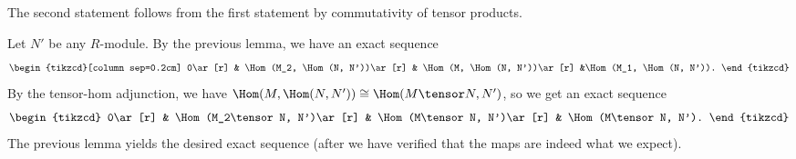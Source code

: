 The second statement follows from the first statement by commutativity
of tensor products.

Let $N'$ be any $R$-module. By the previous lemma, we have an exact sequence
\[\begin{tikzcd}[column sep=0.2cm]
	0\ar[r] & \Hom(M_2, \Hom(N, N'))\ar[r] & \Hom(M, \Hom(N, N'))\ar[r] &\Hom(M_1, \Hom(N, N')).
\end{tikzcd}\]
By the tensor-hom adjunction, we have $\Hom(M, \Hom(N, N'))\cong \Hom(M\tensor N, N')$,
so we get an exact sequence
\[\begin{tikzcd}
	0\ar[r] & \Hom(M_2\tensor N, N')\ar[r] & \Hom(M\tensor N, N')\ar[r] & \Hom(M\tensor N, N').
\end{tikzcd}\]
The previous lemma yields the desired exact sequence (after we have verified that
the maps are indeed what we expect).

